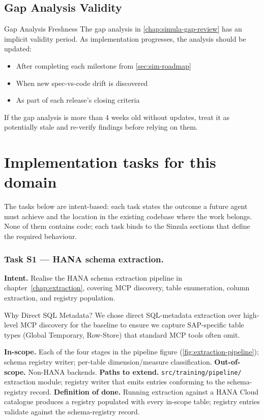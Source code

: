 \subsection{Gap Analysis Validity}

\begin{adrbox}{Gap Analysis Freshness}
The gap analysis in \cref{chap:simula-gap-review} has an implicit validity period.
As implementation progresses, the analysis should be updated:
\begin{itemize}
  \item After completing each milestone from \cref{sec:sim-roadmap}
  \item When new spec-vs-code drift is discovered
  \item As part of each release's closing criteria
\end{itemize}
If the gap analysis is more than 4 weeks old without updates, treat it as
potentially stale and re-verify findings before relying on them.
\end{adrbox}

\section{Implementation tasks for this domain}
\label{sec:agent-tasks}
The tasks below are intent-based: each task states the outcome a
future agent must achieve and the location in the existing codebase
where the work belongs. None of them contains code; each task binds
to the Simula sections that define the required behaviour.

\subsubsection{Task S1 --- HANA schema extraction.}
\textbf{Intent.} Realise the HANA schema extraction pipeline in
chapter~\ref{chap:extraction}, covering MCP discovery, table
enumeration, column extraction, and registry population.

\begin{adrbox}{Why Direct SQL Metadata?}
We chose direct SQL-metadata extraction over high-level MCP discovery for the baseline to ensure we capture SAP-specific table types (Global Temporary, Row-Store) that standard MCP tools often omit.
\end{adrbox}

\textbf{In-scope.} Each of the four stages in the pipeline figure
(\ref{fig:extraction-pipeline}); schema registry writer; per-table
dimension/measure classification.
\textbf{Out-of-scope.} Non-HANA backends.
\textbf{Paths to extend.} \texttt{src/training/pipeline/} extraction
module; registry writer that emits entries conforming to the
schema-registry record.
\textbf{Definition of done.} Running extraction against a HANA
Cloud catalogue produces a registry populated with every in-scope
table; registry entries validate against the schema-registry record.

